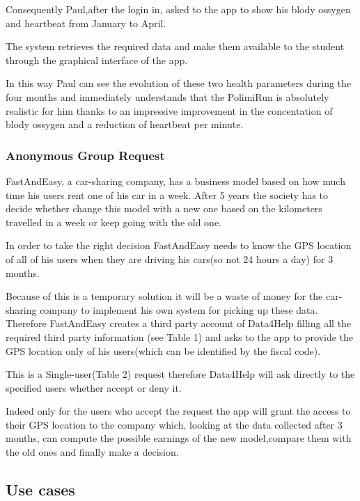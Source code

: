 Consequently Paul,after the login in, asked to the app to show his blody ossygen and heartbeat from January to April. 

The system retrieves the required data and make them available to the student through the graphical interface of the app.

 In this way Paul can see the evolution of these two health parameters during the four months and immediately understands that the PolimiRun is absolutely realistic for him thanks to an impressive improvement in the concentation of blody ossygen and a reduction of heartbeat per minute.

    \subsubsection{Anonymous Group Request}
    FastAndEasy, a car-sharing company, has a business model based on how much time his users rent one of his car in a week. After 5 years the society has to decide whether change this model with a new one based on the kilometers travelled in a week or keep going with the old one. 

In order to take the right decision FastAndEasy needs to know the GPS location of all of his users when they are driving his cars(so not 24 hours a day) for 3 months.

 Because of this is a temporary solution it will be a waste of money for the car-sharing company to implement his own system for picking up these data. Therefore FastAndEasy creates a third party account of Data4Help filling all the required third party information (see Table 1) and asks to the app to provide the GPS location only of his users(which can be identified by the fiscal code).

This is a Single-user(Table 2) request therefore  Data4Help will ask directly to the specified users whether accept or deny it.

 Indeed only for the users who accept the request the app will grant the access to their GPS location to the company which,  looking at the data collected after 3 months, can compute the possible earnings of the new model,compare them with the old ones and finally make a decision.



  \subsection{Use cases}


